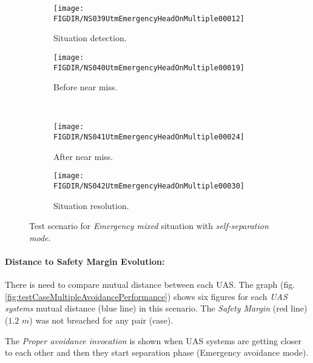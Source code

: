     \begin{figure}[H]
        \centering
        \begin{subfigure}{0.48\textwidth}
        	\centering
            \texttt{[image: \\FIGDIR/NS039UtmEmergencyHeadOnMultiple00012]}
            \caption{Situation detection.}
            \label{fig:emergencyMultipleSituationDetection}
        \end{subfigure}
        \begin{subfigure}{0.48\textwidth}
        	\centering
            \texttt{[image: \\FIGDIR/NS040UtmEmergencyHeadOnMultiple00019]} 
            \caption{Before near miss.}
            \label{fig:emergencyMultipleBeforeNearMiss}
        \end{subfigure}
        \\
        \begin{subfigure}{0.48\textwidth}
        	\centering
            \texttt{[image: \\FIGDIR/NS041UtmEmergencyHeadOnMultiple00024]} 
            \caption{After near miss.}
            \label{fig:emergencyMultipleAfterNearMiss}
        \end{subfigure}
        \begin{subfigure}{0.48\textwidth}
        	\centering
            \texttt{[image: \\FIGDIR/NS042UtmEmergencyHeadOnMultiple00030]} 
            \caption{Situation resolution.}
            \label{fig:emergencyMultipleSituationReslution}
        \end{subfigure}
        \caption{Test scenario for \emph{Emergency mixed} situation with \emph{self-separation mode}.}
        \label{fig:testCaseEmergencyMixed}
    \end{figure}
    
    \paragraph{Distance to Safety Margin Evolution:} There is need to compare mutual distance between each UAS. The graph (fig. \ref{fig:testCaseMultipleAvoidancePerformance}) shows six figures for each \emph{UAS systems} mutual distance (blue line) in this scenario. The \emph{Safety Margin} (red line) ($1.2$ $m$) was not breached for any pair (case). 
    
    The \emph{Proper avoidance invocation} is shown when UAS systems are getting closer to each other and then they start separation phase (Emergency avoidance mode).
            
